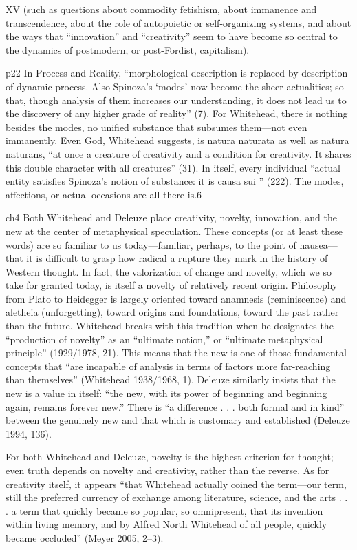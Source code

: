 \documentclass[a4paper]{Thesis}
\begin{document}
XV
(such as questions about commodity fetishism, about immanence
and transcendence, about the role of autopoietic or self-organizing systems,
and about the ways that “innovation” and “creativity” seem to have
become so central to the dynamics of postmodern, or post-Fordist, capitalism).

p22
In Process and Reality, “morphological description is replaced by
description of dynamic process. Also Spinoza’s ‘modes’ now become the
sheer actualities; so that, though analysis of them increases our understanding,
it does not lead us to the discovery of any higher grade of reality” (7).
For Whitehead, there is nothing besides the modes, no unified substance
that subsumes them—not even immanently. Even God, Whitehead suggests,
is natura naturata as well as natura naturans, “at once a creature of creativity
and a condition for creativity. It shares this double character with all creatures”
(31). In itself, every individual “actual entity satisfies Spinoza’s notion
of substance: it is causa sui ” (222). The modes, affections, or actual occasions
are all there is.6

ch4	
Both Whitehead and Deleuze place creativity, novelty, innovation, and the
new at the center of metaphysical speculation. These concepts (or at least these
words) are so familiar to us today—familiar, perhaps, to the point of nausea—
that it is difficult to grasp how radical a rupture they mark in the history of
Western thought. In fact, the valorization of change and novelty, which we so
take for granted today, is itself a novelty of relatively recent origin. Philosophy
from Plato to Heidegger is largely oriented toward anamnesis (reminiscence)
and aletheia (unforgetting), toward origins and foundations, toward the past
rather than the future. Whitehead breaks with this tradition when he designates
the “production of novelty” as an “ultimate notion,” or “ultimate metaphysical
principle” (1929/1978, 21). This means that the new is one of those
fundamental concepts that “are incapable of analysis in terms of factors more
far-reaching than themselves” (Whitehead 1938/1968, 1). Deleuze similarly
insists that the new is a value in itself: “the new, with its power of beginning
and beginning again, remains forever new.” There is “a difference . . . both formal
and in kind” between the genuinely new and that which is customary and
established (Deleuze 1994, 136).

For both Whitehead and Deleuze, novelty is the highest
criterion for thought; even truth depends on novelty and creativity, rather than
the reverse. As for creativity itself, it appears “that Whitehead actually coined
the term—our term, still the preferred currency of exchange among literature,
science, and the arts . . . a term that quickly became so popular, so omnipresent,
that its invention within living memory, and by Alfred North Whitehead of
all people, quickly became occluded” (Meyer 2005, 2–3).
\end{document}
